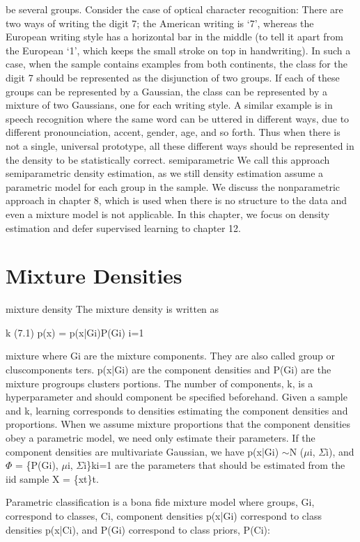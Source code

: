 be several groups. Consider the case of optical character recognition: There are two ways of writing the digit 7; the American writing is ‘7’, whereas the European writing style has a horizontal bar in the middle (to tell it apart from the European ‘1’, which keeps the small stroke on top in handwriting). In such a case, when the sample contains examples from both continents, the class for the digit 7 should be represented as the disjunction of two groups. If each of these groups can be represented by a Gaussian, the class can be represented by a mixture of two Gaussians, one for each writing style. A similar example is in speech recognition where the same word can be uttered in different ways, due to different pronounciation, accent, gender, age, and so forth. Thus when there is not a single, universal prototype, all these different ways should be represented in the density to be statistically correct. semiparametric We call this approach semiparametric density estimation, as we still density estimation assume a parametric model for each group in the sample. We discuss the nonparametric approach in chapter 8, which is used when there is no structure to the data and even a mixture model is not applicable. In this chapter, we focus on density estimation and defer supervised learning to chapter 12.

\section{Mixture Densities}

mixture density The mixture density is written as

k (7.1) p(x) = p(x|Gi)P(Gi) i=1

mixture where Gi are the mixture components. They are also called group or cluscomponents ters. p(x|Gi) are the component densities and P(Gi) are the mixture progroups clusters portions. The number of components, k, is a hyperparameter and should component be specified beforehand. Given a sample and k, learning corresponds to densities estimating the component densities and proportions. When we assume mixture proportions that the component densities obey a parametric model, we need only estimate their parameters. If the component densities are multivariate Gaussian, we have p(x|Gi) $\sim$N ($\mu$i, $\Sigma$i), and $\Phi$ = \{P(Gi), $\mu$i, $\Sigma$i\}ki=1 are the parameters that should be estimated from the iid sample X = \{xt\}t.

Parametric classification is a bona fide mixture model where groups, Gi, correspond to classes, Ci, component densities p(x|Gi) correspond to class densities p(x|Ci), and P(Gi) correspond to class priors, P(Ci):

